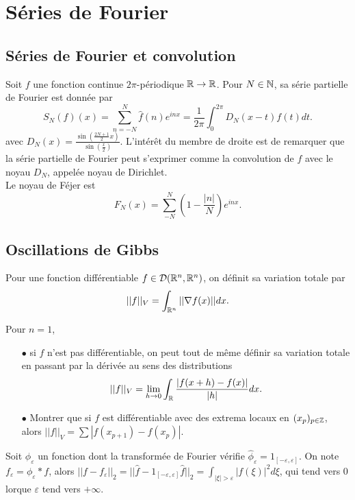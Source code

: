 \section{Séries de Fourier}

\subsection{Séries de Fourier et convolution}

Soit $f$ une fonction continue $2\pi$-périodique $\mathbb R\rightarrow \mathbb R$. Pour $N\in\mathbb N$, sa série partielle de Fourier est donnée par 
\[S_N(f)(x)=\sum_{n=-N}^{N} \hat f(n) e^{inx} = \frac{1}{2\pi}\int_0^{2\pi}D_N(x-t)f(t)dt.\]
avec $D_N(x)=\frac{\sin(\frac{2N+1}{2}x)}{\sin(\frac{x}{2})}$. L'intérêt du membre de droite est de remarquer que la série partielle de Fourier peut s'exprimer comme la convolution de $f$ avec le noyau $D_N$, appelée noyau de Dirichlet.\\  

Le noyau de Féjer est \[F_N(x)=\sum_{-N}^N (1-\frac{|n|}{N})e^{inx}.\]
\subsection{Oscillations de Gibbs}

Pour une fonction différentiable $f\in \mathcal D(\mathbb R^n,\mathbb R^n)$, on définit sa variation totale par 
\[||f||_V=\int_{\mathbb R^n} ||\nabla f(x)||dx.\]

\begin{rk}Pour $n=1$, \\
\begin{itemize}
\item[$\bullet$] si $f$ n'est pas différentiable, on peut tout de même définir sa variation totale en passant par la dérivée au sens des distributions
\[||f||_V=\lim_{h\rightarrow 0}\int_{\mathbb R} \frac{|f(x+h)-f(x)|}{|h|}dx.\]
\item[$\bullet$] Montrer que si $f$ est différentiable avec des extrema locaux en $(x_p)_{p\in \mathbb Z}$, alors $||f||_V=\sum |f(x_{p+1})-f(x_p)|$.
\end{itemize}\end{rk}

Soit $\phi_\varepsilon$ un fonction dont la transformée de Fourier vérifie $\hat\phi_\varepsilon=1_[-\varepsilon,\varepsilon]$. On note $f_\varepsilon= \phi_\varepsilon \ast f$, alors $||f-f_\varepsilon||_2=||\hat f-1_[-\varepsilon,\varepsilon]\hat f||_2=\int_{|\xi|>\varepsilon} |f(\xi)|^2 d\xi $, qui tend vers $0$ lorque $\varepsilon$ tend vers $+\infty$.\\

